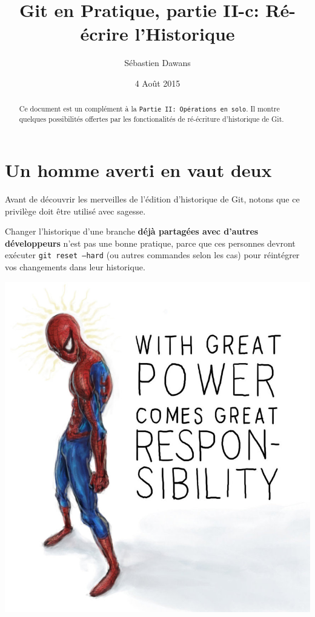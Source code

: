 \documentclass{../../common/tufte-latex/tufte-handout}
\title{Git en Pratique, partie II-c: R\'e-\'ecrire l'Historique}
\author{S\'ebastien Dawans}
\date{4 Ao\^ut 2015} %
\begin{document}
\maketitle%

\begin{abstract}
\noindent
Ce document est un complément à la \texttt{Partie II: Op\'erations en solo}.
Il montre quelques possibilités offertes par les fonctionalités de ré-écriture d'historique de Git.
\end{abstract}

\section{Un homme averti en vaut deux}

Avant de découvrir les merveilles de l'édition d'historique de Git, notons que ce privilège doit être utilisé avec sagesse.

Changer l'historique d'une branche \textbf{déjà partagées avec d'autres développeurs} n'est pas une bonne pratique, parce que ces personnes devront exécuter \texttt{git reset --hard} (ou autres commandes selon les cas) pour réintégrer vos changements dans leur historique.

\begin{marginfigure}%
  \centering
  \includegraphics[width=\linewidth]{spiderman.jpg}
  \label{fig:spiderman}
\end{marginfigure}
\end{document}
